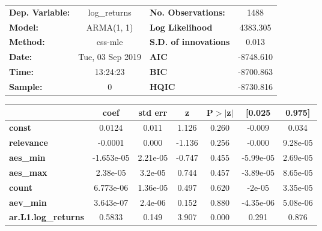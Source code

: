 \begin{center}
\begin{tabular}{lclc}
\toprule
\textbf{Dep. Variable:}     &        log\_returns       & \textbf{  No. Observations:  } &            1488            \\
\textbf{Model:}             &         ARMA(1, 1)        & \textbf{  Log Likelihood     } &          4383.305          \\
\textbf{Method:}            &          css-mle          & \textbf{  S.D. of innovations} &           0.013            \\
\textbf{Date:}              &      Tue, 03 Sep 2019     & \textbf{  AIC                } &         -8748.610          \\
\textbf{Time:}              &          13:24:23         & \textbf{  BIC                } &         -8700.863          \\
\textbf{Sample:}            &             0             & \textbf{  HQIC               } &         -8730.816          \\
\bottomrule
\end{tabular}
\begin{tabular}{lcccccc}
                            & \textbf{coef} & \textbf{std err} & \textbf{z} & \textbf{P$> |$z$|$} & \textbf{[0.025} & \textbf{0.975]}  \\
\midrule
\textbf{const}              &       0.0124  &        0.011     &     1.126  &         0.260        &       -0.009    &        0.034     \\
\textbf{relevance}          &      -0.0001  &        0.000     &    -1.136  &         0.256        &       -0.000    &     9.28e-05     \\
\textbf{aes\_min}           &   -1.653e-05  &     2.21e-05     &    -0.747  &         0.455        &    -5.99e-05    &     2.69e-05     \\
\textbf{aes\_max}           &     2.38e-05  &      3.2e-05     &     0.744  &         0.457        &    -3.89e-05    &     8.65e-05     \\
\textbf{count}              &    6.773e-06  &     1.36e-05     &     0.497  &         0.620        &       -2e-05    &     3.35e-05     \\
\textbf{aev\_min}           &    3.643e-07  &      2.4e-06     &     0.152  &         0.880        &    -4.35e-06    &     5.08e-06     \\
\textbf{ar.L1.log\_returns} &       0.5833  &        0.149     &     3.907  &         0.000        &        0.291    &        0.876     \\

\end{tabular}
\end{center}
